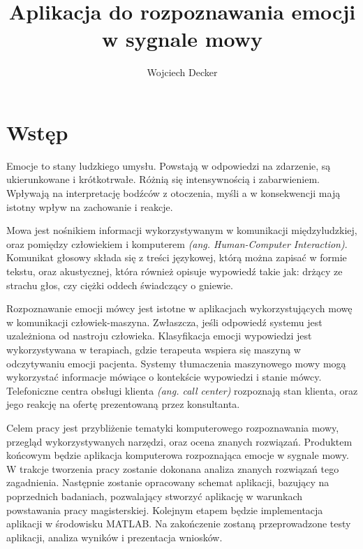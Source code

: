 \documentclass[a4paper,12pt,twoside,openany]{report}
\title{Aplikacja do rozpoznawania emocji w sygnale mowy}
\author{Wojciech Decker}
\newcommand{\ang}[1]{\textit{(ang. #1)}}
\begin{document}
    \maketitle
    \chapter{Wstęp}
    \label{ch:wstep}
    Emocje to stany ludzkiego umysłu.
    Powstają w odpowiedzi na zdarzenie, są ukierunkowane i krótkotrwałe.
    Różnią się intensywnością i zabarwieniem.
    Wpływają na interpretację bodźców z otoczenia,
    myśli a w konsekwencji mają istotny wpływ na zachowanie i reakcje.

    Mowa jest nośnikiem informacji wykorzystywanym w komunikacji międzyludzkiej,
    oraz pomiędzy człowiekiem i komputerem \ang{Human-Computer Interaction}.
    Komunikat głosowy składa się z treści językowej,
    którą można zapisać w formie tekstu,
    oraz akustycznej, która również opisuje wypowiedź takie jak:
    drżący ze strachu głos, czy ciężki oddech świadczący o gniewie.

    Rozpoznawanie emocji mówcy jest istotne w aplikacjach wykorzystujących mowę w komunikacji człowiek-maszyna.
    Zwłaszcza, jeśli odpowiedź systemu jest uzależniona od nastroju człowieka.
    Klasyfikacja emocji wypowiedzi jest wykorzystywana w terapiach,
    gdzie terapeuta wspiera się maszyną w odczytywaniu emocji pacjenta.
    Systemy tłumaczenia maszynowego mowy mogą wykorzystać informacje mówiące o kontekście wypowiedzi i stanie mówcy.
    Telefoniczne centra obsługi klienta \ang{call center} rozpoznają stan klienta,
    oraz jego reakcję na ofertę prezentowaną przez konsultanta.

    Celem pracy jest przybliżenie tematyki komputerowego rozpoznawania mowy,
    przegląd wykorzystywanych narzędzi, oraz ocena znanych rozwiązań.
    Produktem końcowym będzie aplikacja komputerowa rozpoznająca emocje w sygnale mowy.
    W trakcje tworzenia pracy zostanie dokonana analiza znanych rozwiązań tego zagadnienia.
    Następnie zostanie opracowany schemat aplikacji, bazujący na poprzednich badaniach,
    pozwalający stworzyć aplikację w warunkach powstawania pracy magisterskiej.
    Kolejnym etapem będzie implementacja aplikacji w środowisku MATLAB.
    Na zakończenie zostaną przeprowadzone testy aplikacji,
    analiza wyników i prezentacja wniosków.
\end{document}
